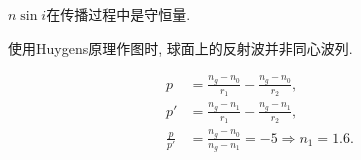 \documentclass{ctexart}
\begin{document}
\begin{ex}[12]
    $n \sin i$在传播过程中是守恒量.
\end{ex}
\begin{ex}
    使用Huygens原理作图时, 球面上的反射波并非同心波列.
\end{ex}
\begin{ex}
    \begin{align*}
        p &= \frac{n_g - n_0}{r_1} - \frac{n_g-n_0}{r_2}, \\
        p' &= \frac{n_g - n_1}{r_1} - \frac{n_g - n_1}{r_2}, \\
        \frac{p}{p'} &= \frac{n_g - n_0}{n_g - n_1} = -5\Rightarrow n_1 = 1.6.
    \end{align*}
\end{ex}
\end{document}
